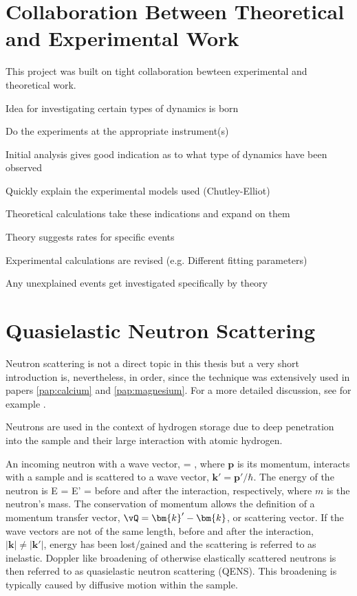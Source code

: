 \section{Collaboration Between Theoretical and Experimental Work}
\label{sec:cooperation}


This project was built on tight collaboration bewteen experimental and theoretical work.
\bit
\item Idea for investigating certain types of dynamics is born
\item Do the experiments at the appropriate instrument(s)
\item Initial analysis gives good indication as to what type of dynamics have been observed
\item Quickly explain the experimental models used (Chutley-Elliot)
\item Theoretical calculations take these indications and expand on them
\item Theory suggests rates for specific events
\item Experimental calculations are revised (e.g. Different fitting parameters)
\item Any unexplained events get investigated specifically by theory
\eit

\placeholder

\section{Quasielastic Neutron Scattering}
\label{sec:qens}


Neutron scattering is not a direct topic in this thesis but a very short introduction is, nevertheless, in order, since the technique was extensively used in papers \ref{pap:calcium} and \ref{pap:magnesium}.
For a more detailed discussion, see for example \citemiss.

Neutrons are used in the context of hydrogen storage due to deep penetration into the sample and their large interaction with atomic hydrogen.~\tred{[B\'ee]}

An incoming neutron with a wave vector,
 = ,
\eeq
where $\bm{p}$ is its momentum, interacts with a sample and is scattered to a wave vector, $\bm{k}' = \bm{p}' / \hbar$.
The energy of the neutron is
E =  \quad {} \quad E' = 
\eeq
before and after the interaction, respectively, where $m$ is the neutron's mass.
The conservation of momentum allows the definition of a momentum transfer vector, $\vQ = \bm{k}' - \bm{k}$, or scattering vector.
If the wave vectors are not of the same length, before and after the interaction, $\left| \bm{k} \right| \ne \left| \bm{k}' \right|$, energy has been lost/gained and the scattering is referred to as inelastic.
Doppler like broadening of otherwise elastically scattered neutrons is then referred to as quasielastic neutron scattering (QENS).
This broadening is typically caused by diffusive motion within the sample.~\citemiss

